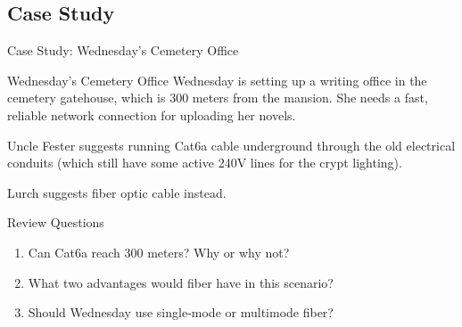 \documentclass[aspectratio=169]{beamer}  %
\begin{document}
\subsection{Case Study}

\begin{frame}{Case Study: Wednesday's Cemetery Office}
    \begin{casestudy}{Wednesday's Cemetery Office}
        Wednesday is setting up a writing office in the cemetery gatehouse, which is 300 meters from the mansion. She needs a fast, reliable network connection for uploading her novels.
        
        \vspace{0.5em}
        Uncle Fester suggests running Cat6a cable underground through the old electrical conduits (which still have some active 240V lines for the crypt lighting).
        
        \vspace{0.5em}
        Lurch suggests fiber optic cable instead.
    \end{casestudy}
    
    \begin{block}{Review Questions}
        \begin{enumerate}
            \item Can Cat6a reach 300 meters? Why or why not?
            \item What two advantages would fiber have in this scenario?
            \item Should Wednesday use single-mode or multimode fiber?
        \end{enumerate}
    \end{block}
\end{frame}
\end{document}
